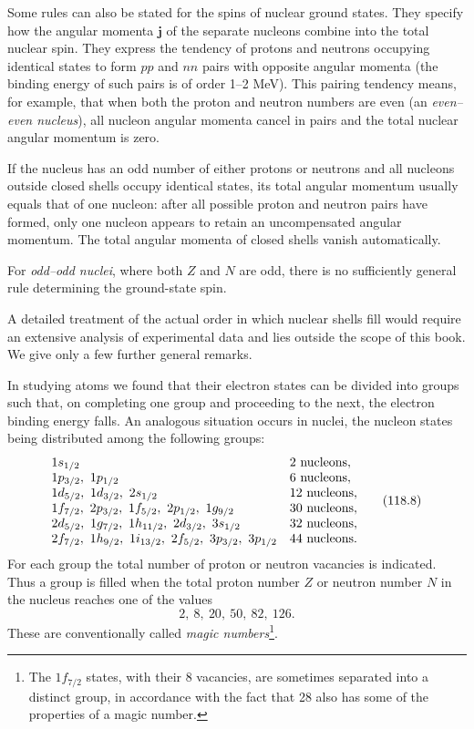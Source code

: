 Some rules can also be stated for the spins of nuclear ground states. They
specify how the angular momenta $\mathbf j$ of the separate nucleons combine
into the total nuclear spin. They express the tendency of protons and neutrons
occupying identical states to form $pp$ and $nn$ pairs with opposite angular
momenta (the binding energy of such pairs is of order 1--2 MeV). This
pairing tendency means, for example, that when both the proton and neutron
numbers are even (an \emph{even--even nucleus}), all nucleon angular momenta
cancel in pairs and the total nuclear angular momentum is zero.

If the nucleus has an odd number of either protons or neutrons and all
nucleons outside closed shells occupy identical states, its total angular
momentum usually equals that of one nucleon: after all possible proton and
neutron pairs have formed, only one nucleon appears to retain an uncompensated
angular momentum. The total angular momenta of closed shells vanish
automatically.

For \emph{odd--odd nuclei}, where both $Z$ and $N$ are odd, there is no
sufficiently general rule determining the ground-state spin.

A detailed treatment of the actual order in which nuclear shells fill would
require an extensive analysis of experimental data and lies outside the scope
of this book. We give only a few further general remarks.

In studying atoms we found that their electron states can be divided into
groups such that, on completing one group and proceeding to the next, the
electron binding energy falls. An analogous situation occurs in nuclei, the
nucleon states being distributed among the following groups:
\begin{equation}
 \begin{array}{@{}ll@{}}
  1s_{1/2} & 2\text{ nucleons},\\
  1p_{3/2},\ 1p_{1/2} & 6\text{ nucleons},\\
  1d_{5/2},\ 1d_{3/2},\ 2s_{1/2} & 12\text{ nucleons},\\
  1f_{7/2},\ 2p_{3/2},\ 1f_{5/2},\ 2p_{1/2},\ 1g_{9/2}
    & 30\text{ nucleons},\\
  2d_{5/2},\ 1g_{7/2},\ 1h_{11/2},\ 2d_{3/2},\ 3s_{1/2}
    & 32\text{ nucleons},\\
  2f_{7/2},\ 1h_{9/2},\ 1i_{13/2},\ 2f_{5/2},\ 3p_{3/2},\ 3p_{1/2}
    & 44\text{ nucleons}.
 \end{array}
 \tag{118.8}
\end{equation}
For each group the total number of proton or neutron vacancies is indicated.
Thus a group is filled when the total proton number $Z$ or neutron number $N$
in the nucleus reaches one of the values
\[
 2,\ 8,\ 20,\ 50,\ 82,\ 126.
\]
These are conventionally called \emph{magic numbers}\footnote{The
$1f_{7/2}$ states, with their 8 vacancies, are sometimes separated into a
distinct group, in accordance with the fact that 28 also has some of the
properties of a magic number.}.

